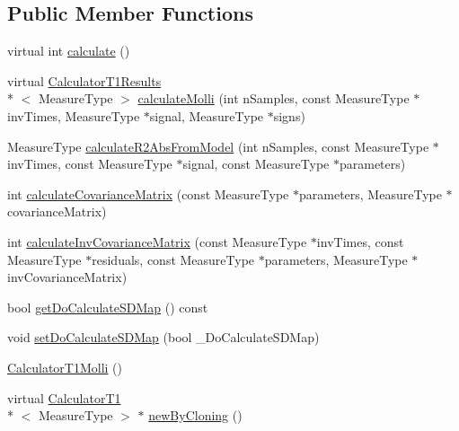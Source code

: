 \subsection*{Public Member Functions}
\begin{DoxyCompactItemize}
\item 
virtual int \hyperlink{class_ox_1_1_calculator_t1_molli_a6f15bc9c026305248c927d62748903bf}{calculate} ()
\item 
virtual \hyperlink{struct_ox_1_1_calculator_t1_results}{Calculator\-T1\-Results}\\*
$<$ Measure\-Type $>$ \hyperlink{class_ox_1_1_calculator_t1_molli_a9cb84f5e8680e1bf6c3543846fc90c4d}{calculate\-Molli} (int n\-Samples, const Measure\-Type $\ast$inv\-Times, Measure\-Type $\ast$signal, Measure\-Type $\ast$signs)
\item 
Measure\-Type \hyperlink{class_ox_1_1_calculator_t1_molli_a9c9238dd8a96e06d3e0a96810377b90b}{calculate\-R2\-Abs\-From\-Model} (int n\-Samples, const Measure\-Type $\ast$inv\-Times, const Measure\-Type $\ast$signal, const Measure\-Type $\ast$parameters)
\item 
int \hyperlink{class_ox_1_1_calculator_t1_molli_a030582bca754a7b81febfae53fe0c10c}{calculate\-Covariance\-Matrix} (const Measure\-Type $\ast$parameters, Measure\-Type $\ast$covariance\-Matrix)
\item 
int \hyperlink{class_ox_1_1_calculator_t1_molli_aec374fc512aa3b109138f0c16c53a171}{calculate\-Inv\-Covariance\-Matrix} (const Measure\-Type $\ast$inv\-Times, const Measure\-Type $\ast$residuals, const Measure\-Type $\ast$parameters, Measure\-Type $\ast$inv\-Covariance\-Matrix)
\item 
bool \hyperlink{class_ox_1_1_calculator_t1_molli_a06d8579492ee063b129b489e638333be}{get\-Do\-Calculate\-S\-D\-Map} () const 
\item 
void \hyperlink{class_ox_1_1_calculator_t1_molli_a65a51dcadaafdefc576201de535f8810}{set\-Do\-Calculate\-S\-D\-Map} (bool \-\_\-\-Do\-Calculate\-S\-D\-Map)
\item 
\hyperlink{class_ox_1_1_calculator_t1_molli_ab1892de078822ea106fcaebcf81047be}{Calculator\-T1\-Molli} ()
\item 
virtual \hyperlink{class_ox_1_1_calculator_t1}{Calculator\-T1}\\*
$<$ Measure\-Type $>$ $\ast$ \hyperlink{class_ox_1_1_calculator_t1_molli_ae0fde362fbe16c4c40dee96330b4a676}{new\-By\-Cloning} ()
\end{DoxyCompactItemize}
